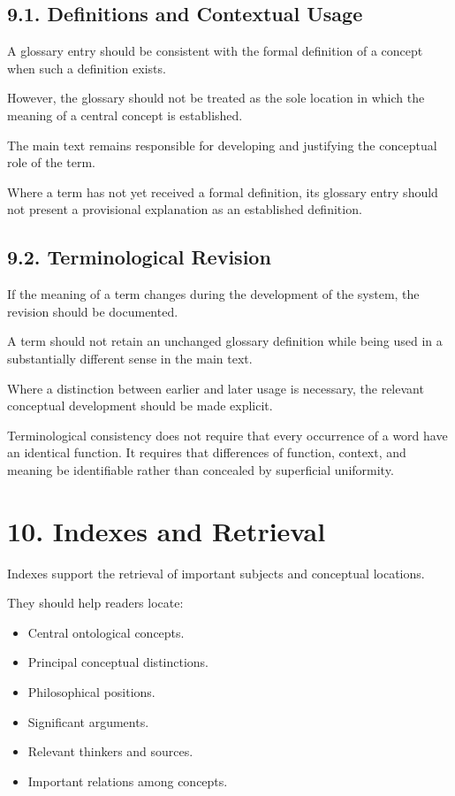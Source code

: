\subsection*{9.1. Definitions and Contextual Usage}

A glossary entry should be consistent with
the formal definition of a concept when such
a definition exists.

However, the glossary should not be treated
as the sole location in which the meaning
of a central concept is established.

The main text remains responsible for developing
and justifying the conceptual role of the term.

Where a term has not yet received a formal
definition, its glossary entry should not
present a provisional explanation as an
established definition.

\subsection*{9.2. Terminological Revision}

If the meaning of a term changes during
the development of the system, the revision
should be documented.

A term should not retain an unchanged glossary
definition while being used in a substantially
different sense in the main text.

Where a distinction between earlier and later
usage is necessary, the relevant conceptual
development should be made explicit.

Terminological consistency does not require
that every occurrence of a word have an
identical function. It requires that differences
of function, context, and meaning be identifiable
rather than concealed by superficial uniformity.


\section*{10. Indexes and Retrieval}

Indexes support the retrieval of important
subjects and conceptual locations.

They should help readers locate:

\begin{itemize}
    \item Central ontological concepts.
    \item Principal conceptual distinctions.
    \item Philosophical positions.
    \item Significant arguments.
    \item Relevant thinkers and sources.
    \item Important relations among concepts.
\end{itemize}

